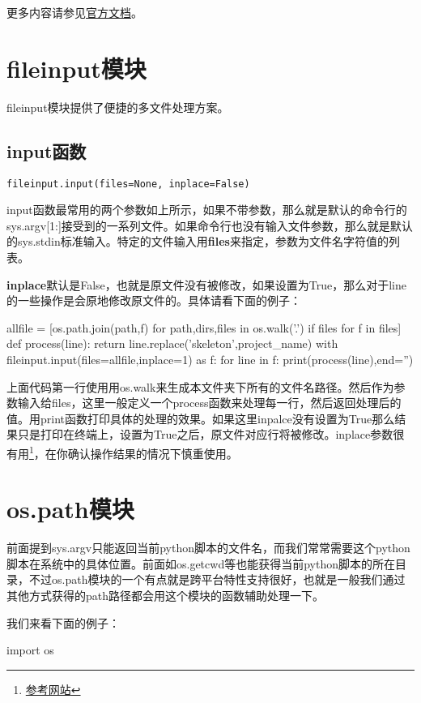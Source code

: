 \documentclass[12pt,oneside]{book}
\begin{document}
\begin{common-format}
\begin{large}
更多内容请参见\href{https://docs.python.org/3/library/sys.html}{官方文档}。
\end{large}


\chapter{fileinput模块}
fileinput模块提供了便捷的多文件处理方案。

\section{input函数}
\begin{Verbatim}
fileinput.input(files=None, inplace=False)
\end{Verbatim}
input函数最常用的两个参数如上所示，如果不带参数，那么就是默认的命令行的sys.argv[1:]接受到的一系列文件。如果命令行也没有输入文件参数，那么就是默认的sys.stdin标准输入。特定的文件输入用\textbf{files}来指定，参数为文件名字符值的列表。

\textbf{inplace}默认是False，也就是原文件没有被修改，如果设置为True，那么对于line的一些操作是会原地修改原文件的。具体请看下面的例子：
\begin{tcbpython}[]
allfile = [os.path.join(path,f) for path,dirs,files in os.walk('.')
        if files for f in files]
def process(line):
    return line.replace('skeleton',project_name)
with fileinput.input(files=allfile,inplace=1) as f:
    for line in f:
        print(process(line),end='')
\end{tcbpython}
上面代码第一行使用用os.walk来生成本文件夹下所有的文件名路径。然后作为参数输入给files，这里一般定义一个process函数来处理每一行，然后返回处理后的值。用print函数打印具体的处理的效果。如果这里inpalce没有设置为True那么结果只是打印在终端上，设置为True之后，原文件对应行将被修改。inplace参数很有用\footnote{\href{http://ruslanspivak.com/2010/10/20/in-place-file-rewrite-with-fileinput/}{参考网站}}，在你确认操作结果的情况下慎重使用。


\chapter{os.path模块}
前面提到sys.argv只能返回当前python脚本的文件名，而我们常常需要这个python脚本在系统中的具体位置。前面如os.getcwd等也能获得当前python脚本的所在目录，不过os.path模块的一个有点就是跨平台特性支持很好，也就是一般我们通过其他方式获得的path路径都会用这个模块的函数辅助处理一下。

我们来看下面的例子：
\begin{tcbpython}[]
import os


\end{tcbpython}
\end{common-format}
\end{document}
